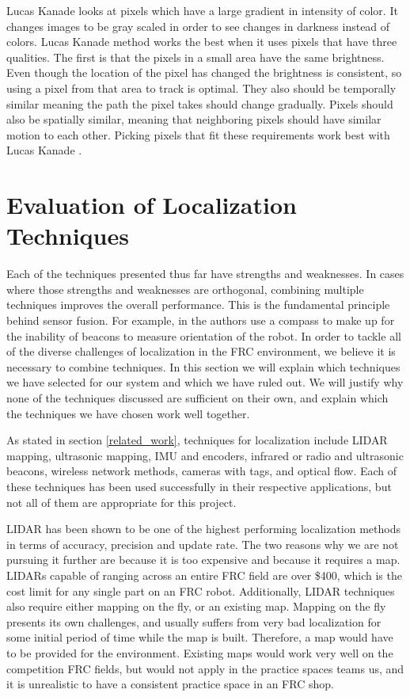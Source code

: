 \documentclass{article}
\begin{document}
	Lucas Kanade looks at pixels which have a large gradient in intensity of color. It changes images to be gray scaled in order to see changes in darkness instead of colors. Lucas Kanade method works the best when it uses pixels that have three qualities. The first is that the pixels in a small area have the same brightness. Even though the location of the pixel has changed the brightness is consistent, so using a pixel from that area to track is optimal. They also should be temporally similar meaning the path the pixel takes should change gradually. Pixels should also be spatially similar, meaning that neighboring pixels should have similar motion to each other. Picking pixels that fit these requirements work best with Lucas Kanade \cite{sun_optical_nodate}.

\section{Evaluation of Localization Techniques} \label{methods}

  Each of the techniques presented thus far have strengths and weaknesses. In cases where those strengths and weaknesses are orthogonal, combining multiple techniques improves the overall performance. This is the fundamental principle behind sensor fusion. For example, in \cite{kim_advanced_2008} the authors use a compass to make up for the inability of beacons to measure orientation of the robot. In order to tackle all of the diverse challenges of localization in the FRC environment, we believe it is necessary to combine techniques. In this section we will explain which techniques we have selected for our system and which we have ruled out. We will justify why none of the techniques discussed are sufficient on their own, and explain which the techniques we have chosen work well together.

  As stated in section \ref{related_work}, techniques for localization include LIDAR mapping, ultrasonic mapping, IMU and encoders, infrared or radio and ultrasonic beacons, wireless network methods, cameras with tags, and optical flow. Each of these techniques has been used successfully in their respective applications, but not all of them are appropriate for this project.

  LIDAR has been shown to be one of the highest performing localization methods in terms of accuracy, precision and update rate. The two reasons why we are not pursuing it further are because it is too expensive and because it requires a map. LIDARs capable of ranging across an entire FRC field are over \$400, which is the cost limit for any single part on an FRC robot. Additionally, LIDAR techniques also require either mapping on the fly, or an existing map. Mapping on the fly presents its own challenges, and usually suffers from very bad localization for some initial period of time while the map is built. Therefore, a map would have to be provided for the environment. Existing maps would work very well on the competition FRC fields, but would not apply in the practice spaces teams us, and it is unrealistic to have a consistent practice space in an FRC shop.
\end{document}
